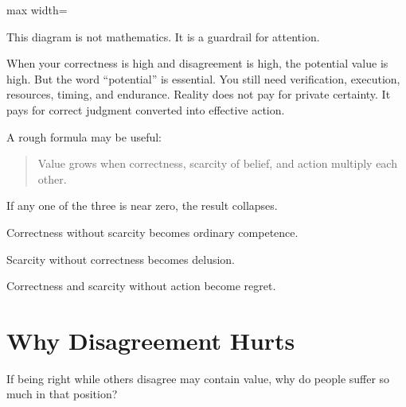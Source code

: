 \begin{center}
\begin{adjustbox}{max width=\linewidth}
\end{adjustbox}
\end{center}

This diagram is not mathematics. It is a guardrail for attention.

When your correctness is high and disagreement is high, the potential value is high. But the word ``potential'' is essential. You still need verification, execution, resources, timing, and endurance. Reality does not pay for private certainty. It pays for correct judgment converted into effective action.

A rough formula may be useful:

\begin{quote}
Value grows when correctness, scarcity of belief, and action multiply each other.
\end{quote}

If any one of the three is near zero, the result collapses.

Correctness without scarcity becomes ordinary competence.

Scarcity without correctness becomes delusion.

Correctness and scarcity without action become regret.

\section*{Why Disagreement Hurts}

If being right while others disagree may contain value, why do people suffer so much in that position?

